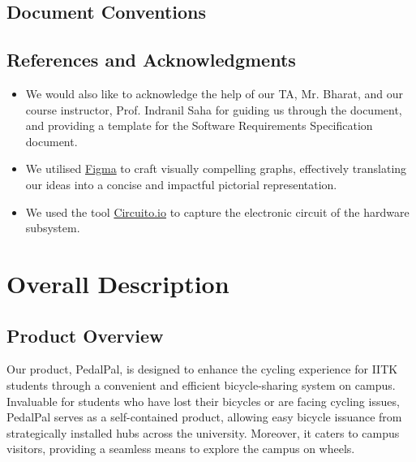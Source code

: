 \documentclass{scrreprt}
\begin{document}
\section{Document Conventions}

\section{References and Acknowledgments}
\begin{itemize}
    \item We would also like to acknowledge the help of our TA, Mr. Bharat, and our course instructor, Prof. Indranil Saha for guiding us through the document, and providing a template for the Software Requirements Specification document.
    \item We utilised \href{https://www.figma.com/}{Figma} to craft visually compelling graphs, effectively translating our ideas into a concise and impactful pictorial representation.
    \item We used the tool \href{https://www.circuito.io/}{Circuito.io} to capture the electronic circuit of the hardware subsystem.
\end{itemize}

\chapter{Overall Description}
\section{Product Overview}
Our product, PedalPal, is designed to enhance the cycling experience for IITK students through a convenient and efficient bicycle-sharing system on campus. Invaluable for students who have lost their bicycles or are facing cycling issues, PedalPal serves as a self-contained product, allowing easy bicycle issuance from strategically installed hubs across the university. Moreover, it caters to campus visitors, providing a seamless means to explore the campus on wheels. 
\end{document}
